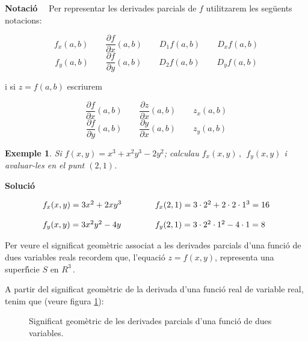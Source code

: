 \documentclass[12pt]{article}
\newcommand{\notacio}{\textbf{Notaci{\'o}}\ \ }
\newcommand{\solucio}{\textbf{Soluci{\'o}}\ \ }
\newtheorem{exemple}{Exemple}[subsection]
\begin{document}
\notacio
Per representar les derivades parcials de $f$
utilitzarem les seg{\"u}ents notacions:

\[
f_{x}(a,b)\qquad\frac{\partial f}{\partial x}(a,b)\qquad
D_{1}f(a,b)\qquad D_{x}f(a,b)
\]
\[
f_y(a,b)\qquad \frac{\partial f}{\partial y}(a,b) \qquad D_2 f(a,b)\qquad D_y
f(a,b)
\]

i si $z=f(a,b)$ escriurem

\[
\frac{\partial f}{\partial x}(a,b)\qquad \frac{\partial z}{\partial
x}(a,b)\qquad z_{x}(a,b)
\]
\[
\frac{\partial f}{\partial y}(a,b)\qquad\frac{\partial y}{\partial
x}(a,b)\qquad z_{y}(a,b)
\]


\vspace{0.4cm}
\begin{exemple}
Si $f(x,y)=x^{3}+x^{2}y^{3}-2y^{2}$; calculau $f_{x}(x,y)\,, \ \ f_{y}(x,y)$ i avaluar-les en el punt $(2,1)$.
\end{exemple}

\solucio

\[
\vspace{0.4cm}
\begin{array}{lcl}
f_{x}(x,y)=3x^{2}+2xy^{3} & \qquad & f_{x}(2,1) = 3 \cdot 2^{2}+2
\cdot 2 \cdot 1^{3} = 16 \\
&\\
 f_{y}(x,y)=3x^{2}y^{2}-4y & \qquad &
f_{y}(2,1) = 3 \cdot 2^{2} \cdot 1^{2} - 4 \cdot 1 = 8
\end{array}
\]

\vspace{0.5cm}

Per veure el significat geom{\`e}tric associat a les derivades parcials d'una
funci{\'o} de dues variables reals recordem que, l'equaci{\'o}
$z=f(x,y)$, representa una superf{\'\i}cie $S$ en $R^{3}\,.$

A partir del significat geom{\`e}tric de la derivada d'una funci{\'o} real
de variable real, tenim que (veure figura \ref{dfdv1}):




\vspace{-0.5cm}
\begin{figure}[h!]
\begin{center}

\end{center}\caption{Significat geom{\`e}tric de les derivades parcials d'una funci{\'o} de dues variables.}\label{dfdv1}
\end{figure}
\end{document}
